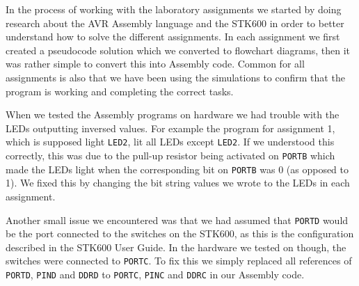 In the process of working with the laboratory assignments we started by doing research about the AVR Assembly language and the STK600 in order to better understand how to solve the different assignments.
In each assignment we first created a pseudocode solution which we converted to flowchart diagrams, then it was rather simple to convert this into Assembly code. Common for all assignments is also that we have been using the simulations to confirm that the program is working and completing the correct tasks. 

When we tested the Assembly programs on hardware we had trouble with the LEDs outputting inversed values. For example the program for assignment 1, which is supposed light \texttt{LED2}, lit all LEDs except \texttt{LED2}. If we understood this correctly, this was due to the pull-up resistor being activated on \texttt{PORTB} which made the LEDs light when the corresponding bit on \texttt{PORTB} was 0 (as opposed to 1). We fixed this by changing the bit string values we wrote to the LEDs in each assignment.

Another small issue we encountered was that we had assumed that \texttt{PORTD} would be the port connected to the switches on the STK600, as this is the configuration described in the STK600 User Guide. In the hardware we tested on though, the switches were connected to \texttt{PORTC}. To fix this we simply replaced all references of \texttt{PORTD}, \texttt{PIND} and \texttt{DDRD} to \texttt{PORTC}, \texttt{PINC} and \texttt{DDRC} in our Assembly code.
